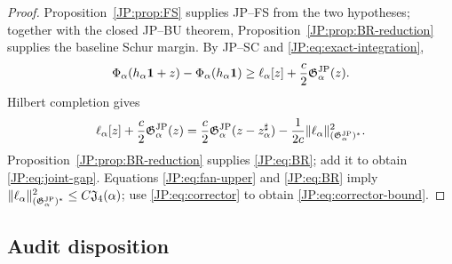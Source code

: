 \begin{proof}
Proposition~\ref{JP:prop:FS} supplies JP--FS from the two hypotheses; together
with the closed JP--BU theorem, Proposition~\ref{JP:prop:BR-reduction} supplies
the baseline Schur margin.
By JP--SC and \eqref{JP:eq:exact-integration},
\[
 \Phi_\alpha(h_\alpha\mathbf1+z)-\Phi_\alpha(h_\alpha\mathbf1)
 \ge \ell_\alpha[z]+\frac c2\mathfrak G^{\rm JP}_\alpha(z).
\]
Hilbert completion gives
\[
 \ell_\alpha[z]+\frac c2\mathfrak G^{\rm JP}_\alpha(z)
 =\frac c2\mathfrak G^{\rm JP}_\alpha(z-z_\alpha^\sharp)
 -\frac1{2c}\|\ell_\alpha\|_{(\mathfrak G^{\rm JP}_\alpha)^*}^2.
\]
Proposition~\ref{JP:prop:BR-reduction} supplies \eqref{JP:eq:BR}; add it to
obtain \eqref{JP:eq:joint-gap}.  Equations
\eqref{JP:eq:fan-upper} and \eqref{JP:eq:BR} imply
$\|\ell_\alpha\|_{(\mathfrak G^{\rm JP}_\alpha)^*}^2\le C\mathfrak J_4(\alpha)$; use
\eqref{JP:eq:corrector} to obtain \eqref{JP:eq:corrector-bound}.
\end{proof}

\subsection{Audit disposition}

